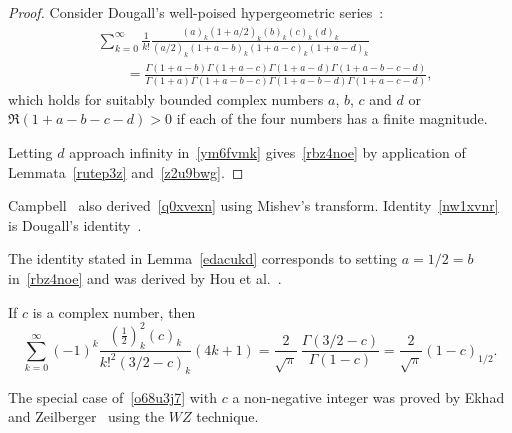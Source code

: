 \documentclass[12pt,reqno]{article}
\begin{document}
\begin{proof}
Consider Dougall's well-poised hypergeometric series~\cite[p.~27]{bailey35}:
\begin{align}\label{ym6fvmk}
&\sum_{k = 0}^\infty  {\frac{1}{{k!}}\frac{{\left( a \right)_k \left( {1 + a/2} \right)_k \left( b \right)_k \left( c \right)_k \left( d \right)_k }}{{\left( {a/2} \right)_k \left( {1 + a - b} \right)_k \left( {1 + a - c} \right)_k \left( {1 + a - d} \right)_k }}}\nonumber\\
&\qquad  = \frac{{\Gamma \left( {1 + a - b} \right)\Gamma \left( {1 + a - c} \right)\Gamma \left( {1 + a - d} \right)\Gamma \left( {1 + a - b - c - d} \right)}}{{\Gamma \left( {1 + a} \right)\Gamma \left( {1 + a - b - c} \right)\Gamma \left( {1 + a - b - d} \right)\Gamma \left( {1 + a - c - d} \right)}},
\end{align}
which holds for suitably bounded complex numbers $a$, $b$, $c$ and $d$ or $\Re(1+a-b-c-d)>0$ if each of the four numbers has a finite magnitude.

Letting $d$ approach infinity in~\eqref{ym6fvmk} gives~\eqref{rbz4noe} by application of Lemmata~\ref{rutep3z} and~\ref{z2u9bwg}.
\end{proof}

\begin{remark}
Campbell~\cite{campbell26} also derived~\eqref{q0xvexn} using Mishev's transform. Identity~\eqref{nw1xvnr} is Dougall's identity~\cite[Equation (16)]{dougall06}.
\end{remark}
The identity stated in Lemma~\ref{edacukd} corresponds to setting $a=1/2=b$ in~\eqref{rbz4noe} and was derived by Hou et al.~\cite{hou24}. 

\begin{lemma}\label{edacukd}
If $c$ is a complex number, then
\begin{equation}\label{o68u3j7}
\sum_{k = 0}^\infty  {( - 1)^k \frac{{\left( {\frac{1}{2}} \right)_k^2 \left( c \right)_k }}{{k!^2 \left( {3/2 - c} \right)_k }}\left( {4k + 1} \right)}  = \frac{2}{{\sqrt \pi  }}\,\frac{{\Gamma \left( {3/2 - c} \right)}}{{\Gamma \left( {1 - c} \right)}}= \frac{2}{{\sqrt \pi  }}(1-c)_{1/2}.
\end{equation}
\end{lemma}

\begin{remark}
The special case of~\eqref{o68u3j7} with $c$ a non-negative integer was proved by Ekhad and Zeilberger~\cite{ekhad94} using the $WZ$ technique.
\end{remark}
\end{document}

